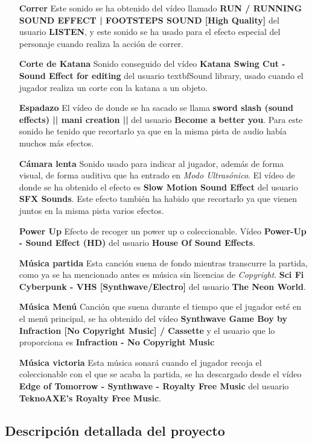 \begin{itemize}
    \item[\textbf{Correr}] Este sonido se ha obtenido del vídeo llamado \textbf{RUN / RUNNING SOUND EFFECT | FOOTSTEPS SOUND [High Quality]} del usuario \textbf{LISTEN}, y este sonido se ha usado para el efecto especial del personaje cuando realiza la acción de correr.
    \item[\textbf{Corte de Katana}] Sonido conseguido del vídeo \textbf{Katana Swing Cut - Sound Effect for editing} del usuario textbf{Sound library}, usado cuando el jugador realiza un corte con la katana a un objeto.
    \item[\textbf{Espadazo}] El vídeo de donde se ha sacado se llama \textbf{sword slash (sound effects) || mani creation ||} del usuario \textbf{Become a better you}. Para este sonido he tenido que recortarlo ya que en la misma pista de audio había muchos más efectos.
    \item[\textbf{Cámara lenta}] Sonido usado para indicar al jugador, además de forma visual, de forma auditiva que ha entrado en \textit{Modo Ultrasónico}. El vídeo de donde se ha obtenido el efecto es \textbf{Slow Motion Sound Effect} del usuario \textbf{SFX Sounds}. Este efecto también ha habido que recortarlo ya que vienen juntos en la misma pista varios efectos.
    \item[\textbf{Power Up}] Efecto de recoger un power up o coleccionable. Vídeo \textbf{Power-Up - Sound Effect (HD)} del usuario \textbf{House Of Sound Effects}.
    \item[\textbf{Música partida}] Esta canción suena de fondo mientras transcurre la partida, como ya se ha mencionado antes es música sin licencias de \textit{Copyright}. \textbf{Sci Fi Cyberpunk - VHS [Synthwave/Electro]} del usuario \textbf{The Neon World}.
    \item[\textbf{Música Menú }] Canción que suena durante el tiempo que el jugador esté en el menú principal, se ha obtenido del vídeo \textbf{Synthwave Game Boy by Infraction [No Copyright Music] / Cassette} y el usuario que lo proporciona es \textbf{Infraction - No Copyright Music}
    \item[\textbf{Música victoria}] Esta música sonará cuando el jugador recoja el coleccionable con el que se acaba la partida, se ha descargado desde el vídeo \textbf{Edge of Tomorrow - Synthwave - Royalty Free Music} del usuario \textbf{TeknoAXE's Royalty Free Music}.  
\end{itemize}

\subsection{Descripción detallada del proyecto }

